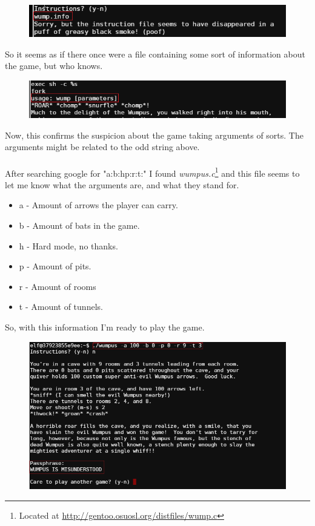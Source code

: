\documentclass[writeup.tex]{subfiles}
\begin{document}
			\begin{figure}[H]
				\centering
				\includegraphics[width=\linewidth]{"screenshots/terminals/Terminal 4 - strings pt2"}
			\end{figure}

			So it seems as if there once were a file containing some sort of information about the game, but who knows.			
			
			\begin{figure}[H]
				\centering
				\includegraphics[width=\linewidth]{"screenshots/terminals/Terminal 4 - strings pt3"}
			\end{figure}
			
			Now, this confirms the suspicion about the game taking arguments of sorts. The arguments might be related to the odd string above.\\
			\\
			After searching google for "a:b:hp:r:t:" I found \textit{wumpus.c}\footnote{Located at \url{http://gentoo.osuosl.org/distfiles/wump.c}} and this file seems to let me know what the arguments are, and what they stand for.\\
			\begin{itemize}
				\item a - Amount of arrows the player can carry.
				\item b - Amount of bats in the game.
				\item h - Hard mode, no thanks.
				\item p - Amount of pits.
				\item r - Amount of rooms
				\item t - Amount of tunnels.		
			\end{itemize}
		
			So, with this information I'm ready to play the game.
			
			\begin{figure}[H]
				\centering
				\includegraphics[width=\linewidth]{"screenshots/terminals/Terminal 4 - wumpus run"}
			\end{figure}
			
\end{document}

